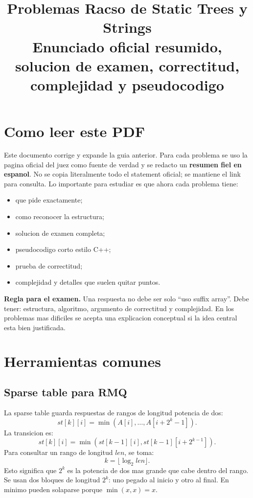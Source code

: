 \documentclass[10pt]{article}
\title{Problemas Racso de Static Trees y Strings\\
\large Enunciado oficial resumido, solucion de examen, correctitud, complejidad y pseudocodigo}
\author{}
\date{}
\begin{document}
\sloppy
\maketitle

\section*{Como leer este PDF}
Este documento corrige y expande la guia anterior. Para cada problema se uso la
pagina oficial del juez como fuente de verdad y se redacto un \textbf{resumen
fiel en espanol}. No se copia literalmente todo el statement oficial; se
mantiene el link para consulta. Lo importante para estudiar es que ahora cada
problema tiene:
\begin{itemize}[leftmargin=*]
\item que pide exactamente;
\item como reconocer la estructura;
\item solucion de examen completa;
\item pseudocodigo corto estilo C++;
\item prueba de correctitud;
\item complejidad y detalles que suelen quitar puntos.
\end{itemize}

\textbf{Regla para el examen.} Una respuesta no debe ser solo ``uso suffix
array''. Debe tener: estructura, algoritmo, argumento de correctitud y
complejidad. En los problemas mas dificiles se acepta una explicacion
conceptual si la idea central esta bien justificada.

\tableofcontents
\newpage

\section{Herramientas comunes}

\subsection{Sparse table para RMQ}
La sparse table guarda respuestas de rangos de longitud potencia de dos:
\[
st[k][i]=\min(A[i],\ldots,A[i+2^k-1]).
\]
La transicion es:
\[
st[k][i]=\min(st[k-1][i],st[k-1][i+2^{k-1}]).
\]
Para consultar un rango de longitud $len$, se toma:
\[
k=\lfloor\log_2 len\rfloor.
\]
Esto significa que $2^k$ es la potencia de dos mas grande que cabe dentro del
rango. Se usan dos bloques de longitud $2^k$: uno pegado al inicio y otro al
final. En minimo pueden solaparse porque $\min(x,x)=x$.
\end{document}
